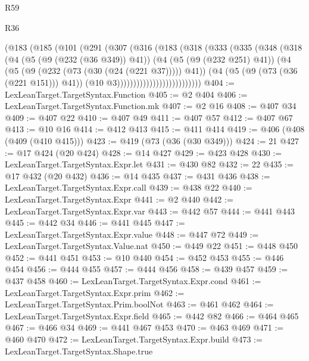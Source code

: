 \begin{lexlean}{R59}
\begin{lexlean}{R36}
\begin{coremodule}
{{{{{{{{{{{{{{{{{{{{{{{{{{{{{{{{{{{{{{{{{{{{{{{{{{{{{{{{{{{{{{{{{{{{{{{{{{{{{{{{{{                      (@183
                        (@185
                          (@101
                            (@291
                              (@307
                                (@316
                                  (@183
                                    (@318
                                      (@333
                                        (@335
                                          (@348
                                            (@318
                                              (@4
                                                (@5 (@9 (@232 (@36 @349)) @41))
                                                (@4
                                                  (@5 (@9 (@232 @251) @41))
                                                  (@4
                                                    (@5
                                                      (@9 (@232 (@73 (@30 (@24 (@221 @37))))) @41))
                                                    (@4
                                                      (@5 (@9 (@73 (@36 (@221 @151))) @41))
                                                      (@10 @3))))))))))))))))))))))))))
@404 := LexLeanTarget.TargetSyntax.Function
@405 := @2 @404
@406 := LexLeanTarget.TargetSyntax.Function.mk
@407 := @2 @16
@408 := @407 @34
@409 := @407 @22
@410 := @407 @49
@411 := @407 @57
@412 := @407 @67
@413 := @10 @16
@414 := @412 @413
@415 := @411 @414
@419 := @406 (@408 (@409 (@410 @415)))
@423 := @419 (@73 (@36 (@30 @349)))
@424 := 21
@427 := @17 @424 (@20 @424)
@428 := @14 @427
@429 := @423 @428
@430 := LexLeanTarget.TargetSyntax.Expr.let
@431 := @430 @82
@432 := 22
@435 := @17 @432 (@20 @432)
@436 := @14 @435
@437 := @431 @436
@438 := LexLeanTarget.TargetSyntax.Expr.call
@439 := @438 @22
@440 := LexLeanTarget.TargetSyntax.Expr
@441 := @2 @440
@442 := LexLeanTarget.TargetSyntax.Expr.var
@443 := @442 @57
@444 := @441 @443
@445 := @442 @34
@446 := @441 @445
@447 := LexLeanTarget.TargetSyntax.Expr.value
@448 := @447 @72
@449 := LexLeanTarget.TargetSyntax.Value.nat
@450 := @449 @22
@451 := @448 @450
@452 := @441 @451
@453 := @10 @440
@454 := @452 @453
@455 := @446 @454
@456 := @444 @455
@457 := @444 @456
@458 := @439 @457
@459 := @437 @458
@460 := LexLeanTarget.TargetSyntax.Expr.cond
@461 := LexLeanTarget.TargetSyntax.Expr.prim
@462 := LexLeanTarget.TargetSyntax.Prim.boolNot
@463 := @461 @462
@464 := LexLeanTarget.TargetSyntax.Expr.field
@465 := @442 @82
@466 := @464 @465
@467 := @466 @34
@469 := @441 @467 @453
@470 := @463 @469
@471 := @460 @470
@472 := LexLeanTarget.TargetSyntax.Expr.build
@473 := LexLeanTarget.TargetSyntax.Shape.true
}}}}}}}}}}}}}}}}}}}}}}}}}}}}}}}}}}}}}}}}}}}}}}}}}}}}}}}}}}}}}}}}}}}}}}}}}}}}}}}}}}
\end{coremodule}
\end{lexlean}
\end{lexlean}
